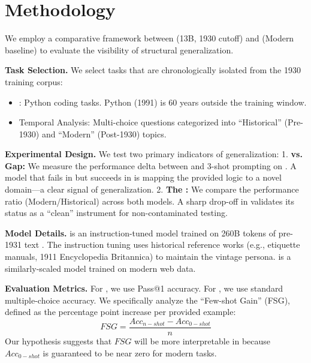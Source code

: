 \section{Methodology}
\label{sec:method}

We employ a comparative framework between \talkie (13B, 1930 cutoff) and \talkieweb (Modern baseline) to evaluate the visibility of structural generalization.

{\bf Task Selection.} We select tasks that are chronologically isolated from the 1930 training corpus:
\begin{itemize}[leftmargin=*,itemsep=0pt,topsep=0pt]
    \item \humaneval: Python coding tasks. Python (1991) is 60 years outside the training window.
    \item \mmlu Temporal Analysis: Multi-choice questions categorized into ``Historical'' (Pre-1930) and ``Modern'' (Post-1930) topics.
\end{itemize}

{\bf Experimental Design.} We test two primary indicators of generalization:
1. {\bf \zeroshot vs. \fewshot Gap:} We measure the performance delta between \zeroshot and 3-shot prompting on \humaneval. A model that fails in \zeroshot but succeeds in \fewshot is mapping the provided logic to a novel domain—a clear signal of generalization.
2. {\bf The \cliff:} We compare the performance ratio (Modern/Historical) across both models. A sharp drop-off in \talkie validates its status as a ``clean'' instrument for non-contaminated testing.

{\bf Model Details.} \talkie is an instruction-tuned model trained on 260B tokens of pre-1931 text \cite{radford2026talkie}. The instruction tuning uses historical reference works (e.g., etiquette manuals, 1911 Encyclopedia Britannica) to maintain the vintage persona. \talkieweb is a similarly-scaled model trained on modern web data.

{\bf Evaluation Metrics.} For \humaneval, we use Pass@1 accuracy. For \mmlu, we use standard multiple-choice accuracy. We specifically analyze the ``Few-shot Gain'' (FSG), defined as the percentage point increase per provided example:
\begin{equation}
    FSG = \frac{Acc_{n-shot} - Acc_{0-shot}}{n}
\end{equation}
Our hypothesis suggests that $FSG$ will be more interpretable in \talkie because $Acc_{0-shot}$ is guaranteed to be near zero for modern tasks.
